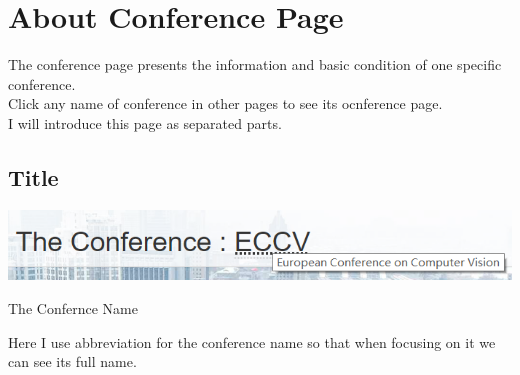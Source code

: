 \documentclass{article}
\begin{document}
	\section{About Conference Page}
	The conference page presents the information and basic condition of one specific conference.\\
	Click any name of conference in other pages to see its ocnference page.\\
	I will introduce this page as separated parts.
	\subsection{Title}
	\includegraphics[width=\textwidth]{title1.png}\\
	\centerline{\small The Confernce Name}
	Here I use abbreviation for the conference name so that when focusing on it we can see its full name.
	
\end{document}
